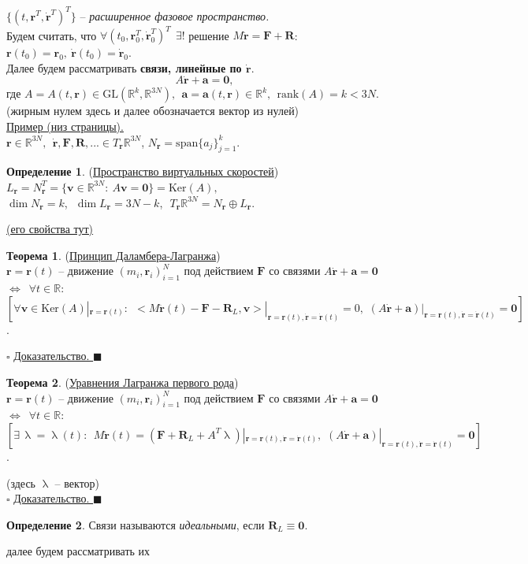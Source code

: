 \documentclass[specialist, subf, href, colorlinks=true, 12pt, times, mtpro, final]{disser}
\theoremstyle{definition}
\newtheorem{defn}{Определение}[section]
\newtheorem{theorem}{Теорема}[section]
\def\note{\textcolor{faded}}
\def\rk{\text{rank}}
\def\span{\text{span}}
\def\bfr{\mathbf{r}}
\def\bfrd{\dot{\bfr}}
\def\bfrdd{\ddot{\bfr}}
\def\bfF{\mathbf{F}}
\def\bfv{\mathbf{v}}
\def\bfR{\mathbf{R}}
\def\bfzero{\mathbf{0}}
\def\bfa{\mathbf{a}}
\begin{document}
    $\{(t, \bfr^T, \bfrd^T)^T\}$ -- {\it расширенное фазовое пространство.}\\
    Будем считать, что $\forall (t_0, \bfr_0^T, \bfrd_0^T)^T \ \ \exists!$ решение
    $M\bfrdd = \bfF + \bfR$:\\ $\bfr(t_0) = \bfr_0,\ \bfrd(t_0) = \bfrd_0$.\\
    Далее будем рассматривать {\bf связи, линейные по $\bfrd$}.
    $$
    \boxed{
    A\bfrd + \bfa = \bfzero},
    $$
    где $A=A(t,\bfr)\in\text{GL}(\mathbb{R}^k, \mathbb{R}^{3N}),\ \ \bfa=\bfa(t,\bfr)\in\mathbb{R}^k,\ \ \rk(A) = k < 3N$.\\
    \note{(жирным нулем здесь и далее обозначается вектор из нулей)}\\
    \noindent\hyperlink{first_lects.2}{Пример (низ страницы).}\\
    $\bfr\in\mathbb{R}^{3N},\ \ \bfrd, \bfF, \bfR,... \in T_{\bfr}\mathbb{R}^{3N}$,
    $N_{\bfr} = \span\{a_j\}_{j=1}^k$.
    \begin{defn} (\hyperlink{first_lects.3}{Пространство виртуальных скоростей})\\
    $L_{\bfr} = N_{\bfr}^T = \{\bfv\in\mathbb{R}^{3N}:\ A\bfv=\bfzero\} = \text{Ker}(A),$\\
    $\dim N_{\bfr} = k$,\,\, $\dim L_{\bfr} = 3N-k$,\,\,  $T_{\bfr}\mathbb{R}^{3N} = N_{\bfr}\oplus L_{\bfr}$.
    \end{defn}
    \noindent\hyperlink{first_lects.3}{(его свойства тут)}
    \begin{theorem} (\hyperlink{first_lects.3}{Принцип Даламбера-Лагранжа})\\
    $\bfr=\bfr(t)$ -- движение $(m_i, \bfr_i)_{i=1}^N$ под действием $\bfF$ со
    связями $A\bfrd+\bfa=\bfzero$ $\Longleftrightarrow\,\,\,\forall t\in\mathbb{R}:\,$\\
    $\left[ \forall\bfv\in\text{Ker}(A)|_{\bfr=\bfr(t)}:\ \ <M\bfrdd(t)-\bfF-\bfR_L,\bfv>
    |_{\bfr=\bfr(t),\bfrd=\bfrd(t)} = 0,\,\,(A\bfrd+\bfa)|_{\bfr=\bfr(t),\bfrd=\bfrd(t)}=\bfzero \right]$.
    \end{theorem}
    \noindent$\square$ \hyperlink{first_lects.4}{ Доказательство. } $\blacksquare$
    \begin{theorem} (\hyperlink{first_lects.5}{Уравнения Лагранжа первого рода})\\
    $\bfr=\bfr(t)$ -- движение $(m_i, \bfr_i)_{i=1}^N$ под действием $\bfF$ со
    связями $A\bfrd+\bfa=\bfzero$ $\Longleftrightarrow\,\,\,\forall t\in\mathbb{R}:\,$\\
    $\left[ \exists\,\uplambda=\uplambda(t):\ \ M\bfrdd(t)=(\bfF+\bfR_L+A^T\uplambda)|_{\bfr=\bfr(t),\bfrd=\bfrd(t)},\,\,(A\bfrd+\bfa)|_{\bfr=\bfr(t),\bfrd=\bfrd(t)}=\bfzero \right]$.
    \end{theorem}
    \noindent\note{(здесь $\uplambda$ -- вектор)}\\
    \noindent$\square$ \hyperlink{first_lects.6}{ Доказательство. } $\blacksquare$
    \begin{defn}
    Связи называются {\it идеальными}, если $\bfR_L \equiv \bfzero$.
    \end{defn}
    \note{далее будем рассматривать их}
    
\end{document}

